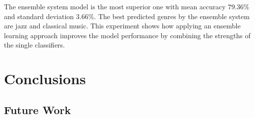 \documentclass[a4paper,11pt,oneside]{article}
\begin{document}
  The ensemble system model is the most superior one with mean accuracy $79.36\%$ and
  standard deviation $3.66\%$. The best predicted genres by the ensemble system are jazz and classical music.
  This experiment shows how applying an ensemble learning approach improves the model performance
  by combining the strengths of the single classifiers. 
   
\section{Conclusions}
\subsection{Future Work}
\nocite{*}
\newpage


\end{document}

